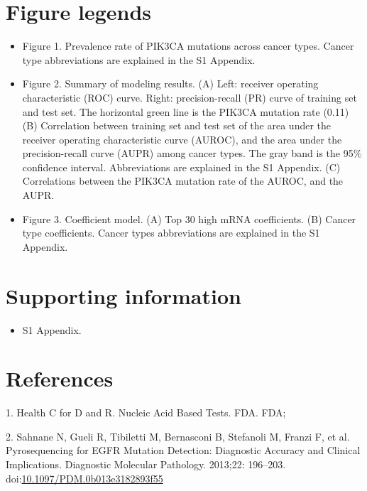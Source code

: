 \documentclass[10pt,letterpaper]{article}
\providecommand{\tightlist}{%
  \setlength{\itemsep}{0pt}\setlength{\parskip}{0pt}}
\begin{document}
\hypertarget{figure-legends}{%
\section{Figure legends}\label{figure-legends}}

\begin{itemize}
\item
  Figure 1. Prevalence rate of PIK3CA mutations across cancer types.
  Cancer type abbreviations are explained in the S1 Appendix.
\item
  Figure 2. Summary of modeling results. (A) Left: receiver operating
  characteristic (ROC) curve. Right: precision-recall (PR) curve of
  training set and test set. The horizontal green line is the PIK3CA
  mutation rate (0.11) (B) Correlation between training set and test set
  of the area under the receiver operating characteristic curve (AUROC),
  and the area under the precision-recall curve (AUPR) among cancer
  types. The gray band is the 95\% confidence interval. Abbreviations
  are explained in the S1 Appendix. (C) Correlations between the PIK3CA
  mutation rate of the AUROC, and the AUPR.
\item
  Figure 3. Coefficient model. (A) Top 30 high mRNA coefficients. (B)
  Cancer type coefficients. Cancer types abbreviations are explained in
  the S1 Appendix.
\end{itemize}

\hypertarget{supporting-information}{%
\section{Supporting information}\label{supporting-information}}

\begin{itemize}
\tightlist
\item
  S1 Appendix.
\end{itemize}

\hypertarget{references}{%
\section*{References}\label{references}}

\hypertarget{refs}{}
\leavevmode\hypertarget{ref-healthNucleicAcidBased2020}{}%
1. Health C for D and R. Nucleic Acid Based Tests. FDA. FDA;

\leavevmode\hypertarget{ref-sahnanePyrosequencingEGFRMutation2013}{}%
2. Sahnane N, Gueli R, Tibiletti M, Bernasconi B, Stefanoli M, Franzi F,
et al. Pyrosequencing for EGFR Mutation Detection: Diagnostic Accuracy
and Clinical Implications. Diagnostic Molecular Pathology. 2013;22:
196--203.
doi:\href{https://doi.org/10.1097/PDM.0b013e3182893f55}{10.1097/PDM.0b013e3182893f55}
\end{document}
